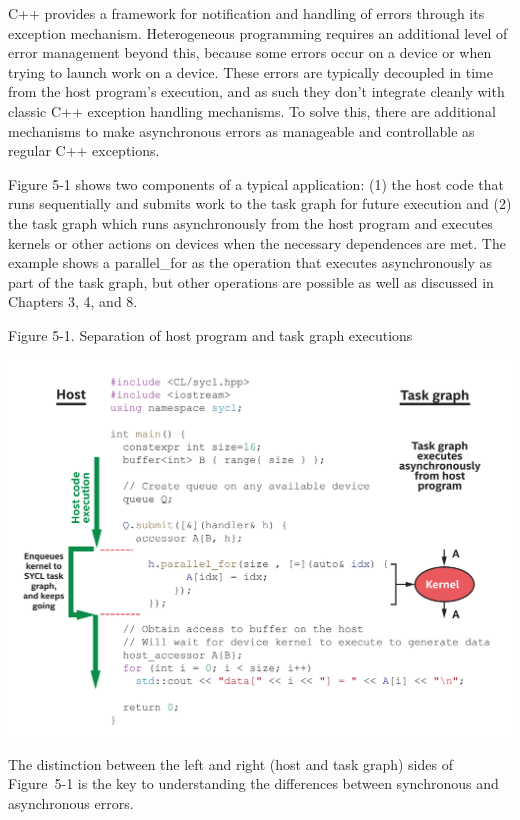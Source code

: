 C++ provides a framework for notification and handling of errors through its exception mechanism. Heterogeneous programming requires an additional level of error management beyond this, because some errors occur on a device or when trying to launch work on a device. These errors are typically decoupled in time from the host program’s execution, and as such they don’t integrate cleanly with classic C++ exception handling mechanisms. To solve this, there are additional mechanisms to make asynchronous errors as manageable and controllable as regular C++ exceptions.\par

Figure 5-1 shows two components of a typical application: (1) the host code that runs sequentially and submits work to the task graph for future execution and (2) the task graph which runs asynchronously from the host program and executes kernels or other actions on devices when the necessary dependences are met. The example shows a parallel\_for as the operation that executes asynchronously as part of the task graph, but other operations are possible as well as discussed in Chapters 3, 4, and 8.\par

\hspace*{\fill} \par %
Figure 5-1. Separation of host program and task graph executions
\begin{center}
	\includegraphics[width=1.0\textwidth]{content/chapter-5/images/2}
\end{center}

The distinction between the left and right (host and task graph) sides of Figure 5-1 is the key to understanding the differences between synchronous and asynchronous errors.\par


